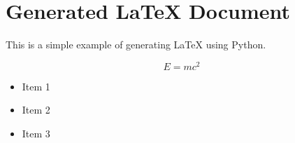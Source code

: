 \documentclass{article}
\begin{document}
\section*{Generated LaTeX Document}

This is a simple example of generating LaTeX using Python.

\begin{equation}
    E = mc^2
\end{equation}

\begin{itemize}
    \item Item 1
    \item Item 2
    \item Item 3
\end{itemize}
\end{document}
